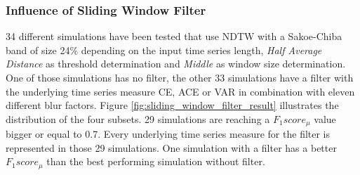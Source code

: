 \subsubsection{Influence of Sliding Window Filter} \label{influence_of_sliding_window_filter}
34 different simulations have been tested that use NDTW with a Sakoe-Chiba band of size 24\% depending on the input
time series length, \textit{Half Average Distance} as threshold determination and \textit{Middle} as window size
determination. One of those simulations has no filter, the other 33 simulations have a filter with the underlying time
series measure CE, ACE or VAR in combination with eleven different blur factors. Figure
\ref{fig:sliding_window_filter_result} illustrates the distribution of the four subsets. 29 simulations are reaching a
$F_{1}score_{\mu}$ value bigger or equal to 0.7. Every underlying time series measure for the filter is represented in
those 29 simulations. One simulation with a filter has a better $F_{1}score_{\mu}$ than the best performing simulation
without filter.

